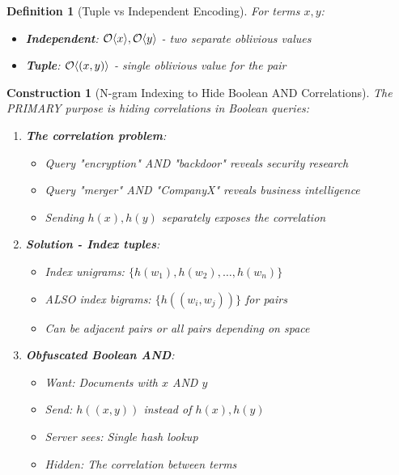 \documentclass[11pt,final]{article}
\newtheorem{definition}[theorem]{Definition}
\newtheorem{construction}[theorem]{Construction}
\begin{document}
\begin{definition}[Tuple vs Independent Encoding]
For terms $x, y$:
\begin{itemize}
    \item \textbf{Independent}: $\mathcal{O}\langle x \rangle, \mathcal{O}\langle y \rangle$ - two separate oblivious values
    \item \textbf{Tuple}: $\mathcal{O}\langle (x,y) \rangle$ - single oblivious value for the pair
\end{itemize}
\end{definition}

\begin{construction}[N-gram Indexing to Hide Boolean AND Correlations]
The PRIMARY purpose is hiding correlations in Boolean queries:
\begin{enumerate}
    \item \textbf{The correlation problem}:
        \begin{itemize}
            \item Query "encryption" AND "backdoor" reveals security research
            \item Query "merger" AND "CompanyX" reveals business intelligence
            \item Sending $h(x), h(y)$ separately exposes the correlation
        \end{itemize}
    \item \textbf{Solution - Index tuples}:
        \begin{itemize}
            \item Index unigrams: $\{h(w_1), h(w_2), \ldots, h(w_n)\}$
            \item ALSO index bigrams: $\{h((w_i, w_j))\}$ for pairs
            \item Can be adjacent pairs or all pairs depending on space
        \end{itemize}
    \item \textbf{Obfuscated Boolean AND}:
        \begin{itemize}
            \item Want: Documents with $x$ AND $y$
            \item Send: $h((x,y))$ instead of $h(x), h(y)$
            \item Server sees: Single hash lookup
            \item Hidden: The correlation between terms
        \end{itemize}
\end{enumerate}
\end{construction}
\end{document}
